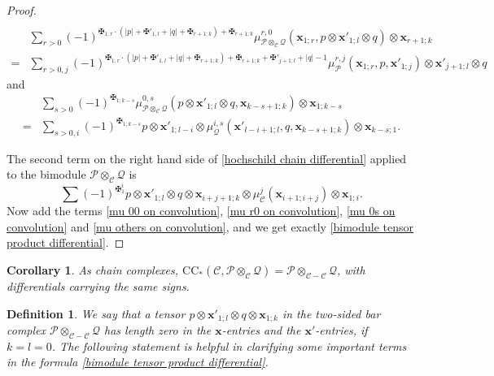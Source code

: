 \documentclass[11pt]{amsproc}
\def\cP{\mathcal{P}}
\def\cQ{\mathcal{Q}}
\def\cc{\mathcal{C}}
\def\r#1{\mathrm{#1}}
\newtheorem{cor}[lem]{Corollary}
\newtheorem{defn}[lem]{Definition}
\theoremstyle{remark}
\numberwithin{equation}{section}
\begin{document}
\begin{proof}
\begin{equation}
\begin{split}
\end{split}
\end{equation}
\begin{equation}\label{mu r0 on convolution}
\begin{split}
& \sum_{r>0} (-1)^{\maltese_{1;r} \cdot (|p|  + \maltese'_{1, l} + |q| + \maltese_{r+1;k}) + \maltese_{r+1;k}} \mu_{\cP \otimes_{\cc} \cQ}^{r, 0}(\mathbf{x}_{1;r}, p \otimes \mathbf{x}'_{1;l} \otimes q) \otimes \mathbf{x}_{r+1;k} \\
= & \sum_{r>0, j} (-1)^{\maltese_{1;r} \cdot (|p| + \maltese'_{1, l} + |q| + \maltese_{r+1;k}) + \maltese_{r+1;k} + \maltese'_{j+1;l} + |q| - 1} \mu_{\cP}^{r, j}(\mathbf{x}_{1;r}, p, \mathbf{x}'_{1; j}) \otimes \mathbf{x}'_{j+1;l} \otimes q
\end{split}
\end{equation}
and
\begin{equation}\label{mu 0s on convolution}
\begin{split}
 & \sum_{s>0} (-1)^{\maltese_{1; k-s}} \mu_{\cP \otimes_{\cc} \cQ}^{0, s}(p \otimes \mathbf{x}'_{1;l} \otimes q, \mathbf{x}_{k-s+1;k}) \otimes \mathbf{x}_{1; k-s} \\
 = & \sum_{s>0, i} (-1)^{\maltese_{1; k-s}} p \otimes \mathbf{x}'_{1;l-i} \otimes \mu_{\cQ}^{i, s}(\mathbf{x}'_{l-i+1;l}, q, \mathbf{x}_{k-s+1;k}) \otimes \mathbf{x}_{k-s; 1}.
 \end{split}
 \end{equation}
 
 The second term on the right hand side of \eqref{hochschild chain differential} applied to the bimodule $\cP \otimes_{\cc} \cQ$ is 
 \begin{equation}\label{mu others on convolution}
  \sum (-1)^{\maltese_{1}^{i}} p \otimes \mathbf{x}'_{1;l} \otimes q \otimes \mathbf{x}_{i+j+1; k} \otimes \mu^{j}_{\cc}(\mathbf{x}_{i+1; i+j}) \otimes \mathbf{x}_{1; i}.
 \end{equation}
 Now add the terms \eqref{mu 00 on convolution}, \eqref{mu r0 on convolution}, \eqref{mu 0s on convolution} and \eqref{mu others on convolution}, 
 and we get exactly \eqref{bimodule tensor product differential}.
\end{proof}

\begin{cor}
As chain complexes, $\r{CC}_{*}(\cc, \cP \otimes_{\cc} \cQ) = \cP \otimes_{\cc-\cc} \cQ$,
with differentials carrying the same signs.
\end{cor}

\begin{defn}\label{def: length zero tensors}
We say that a tensor $p \otimes \mathbf{x}'_{1;l} \otimes q \otimes \mathbf{x}_{1;k}$ in the two-sided bar complex $\cP \otimes_{\cc-\cc} \cQ$ has length zero in the $\mathbf{x}$-entries and the $\mathbf{x}'$-entries, if $k = l = 0$.
The following statement is helpful in clarifying some important terms in the formula \eqref{bimodule tensor product differential}.
\end{defn}
\end{document}
